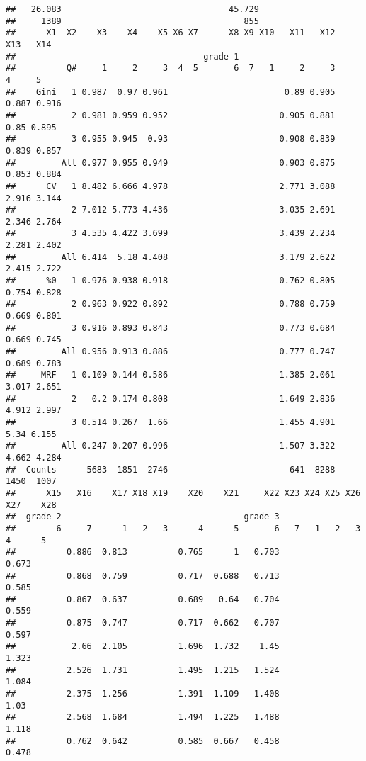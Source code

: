 \documentclass[
]{article}
\begin{document}
\begin{verbatim}
##   26.083                                 45.729
##     1389                                    855
##      X1  X2    X3    X4    X5 X6 X7      X8 X9 X10   X11   X12   X13   X14
##                                     grade 1                               
##          Q#     1     2     3  4  5       6  7   1     2     3     4     5
##    Gini   1 0.987  0.97 0.961                       0.89 0.905 0.887 0.916
##           2 0.981 0.959 0.952                      0.905 0.881  0.85 0.895
##           3 0.955 0.945  0.93                      0.908 0.839 0.839 0.857
##         All 0.977 0.955 0.949                      0.903 0.875 0.853 0.884
##      CV   1 8.482 6.666 4.978                      2.771 3.088 2.916 3.144
##           2 7.012 5.773 4.436                      3.035 2.691 2.346 2.764
##           3 4.535 4.422 3.699                      3.439 2.234 2.281 2.402
##         All 6.414  5.18 4.408                      3.179 2.622 2.415 2.722
##      %0   1 0.976 0.938 0.918                      0.762 0.805 0.754 0.828
##           2 0.963 0.922 0.892                      0.788 0.759 0.669 0.801
##           3 0.916 0.893 0.843                      0.773 0.684 0.669 0.745
##         All 0.956 0.913 0.886                      0.777 0.747 0.689 0.783
##     MRF   1 0.109 0.144 0.586                      1.385 2.061 3.017 2.651
##           2   0.2 0.174 0.808                      1.649 2.836 4.912 2.997
##           3 0.514 0.267  1.66                      1.455 4.901  5.34 6.155
##         All 0.247 0.207 0.996                      1.507 3.322 4.662 4.284
##  Counts      5683  1851  2746                        641  8288  1450  1007
##      X15   X16    X17 X18 X19    X20    X21     X22 X23 X24 X25 X26 X27    X28
##  grade 2                                    grade 3                           
##        6     7      1   2   3      4      5       6   7   1   2   3   4      5
##          0.886  0.813          0.765      1   0.703                      0.673
##          0.868  0.759          0.717  0.688   0.713                      0.585
##          0.867  0.637          0.689   0.64   0.704                      0.559
##          0.875  0.747          0.717  0.662   0.707                      0.597
##           2.66  2.105          1.696  1.732    1.45                      1.323
##          2.526  1.731          1.495  1.215   1.524                      1.084
##          2.375  1.256          1.391  1.109   1.408                       1.03
##          2.568  1.684          1.494  1.225   1.488                      1.118
##          0.762  0.642          0.585  0.667   0.458                      0.478

\end{verbatim}
\end{document}
